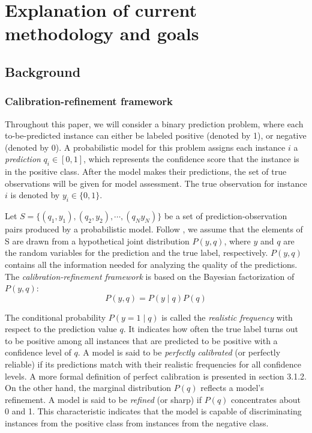 \chapter{Explanation of current methodology and goals}
\section{Background}

\subsection{Calibration-refinement framework}

Throughout this paper, we will consider a binary prediction problem, where each to-be-predicted instance can either be labeled positive (denoted by 1), or negative (denoted by 0). A probabilistic model for this problem assigns each instance $i$ a \textit{prediction} $q_i \in [0, 1]$, which represents the confidence score that the instance is in the positive class. After the model makes their predictions, the set of true observations will be given for model assessment. The true observation for instance $i$ is denoted by $y_i \in \{0, 1\}$.  

Let $S = \{(q_1, y_1), (q_2, y_2), \cdots, (q_N y_N)\}$ be a set of prediction-observation pairs produced by a probabilistic model. Follow \cite{murphy1984probability}, we assume that the elements of S are drawn from a hypothetical joint distribution $P(y, q)$, where $y$ and $q$ are the random variables for the prediction and the true label, respectively. $P(y, q)$ contains all the information needed for analyzing the quality of the predictions. The \textit{calibration-refinement framework} is based on the Bayesian factorization of $P(y, q)$:
\begin{equation}
  P(y, q) = P(y \mid q)P(q)
  \label{eqn:calib-ref-factor}
\end{equation}

The conditional probability $P(y = 1 \mid q)$ is called the \textit{realistic frequency} with respect to the prediction value $q$. It indicates how often the true label turns out to be positive among all instances that are predicted to be positive with a confidence level of $q$. A model is said to be \textit{perfectly calibrated} (or perfectly reliable) if its predictions match with their realistic frequencies for all confidence levels. A more formal definition of perfect calibration is presented in section 3.1.2. On the other hand, the marginal distribution $P(q)$ reflects a model's refinement. A model is said to be \textit{refined} (or sharp) if $P(q)$ concentrates about 0 and 1. This characteristic indicates that the model is capable of discriminating instances from the positive class from instances from the negative class.   

